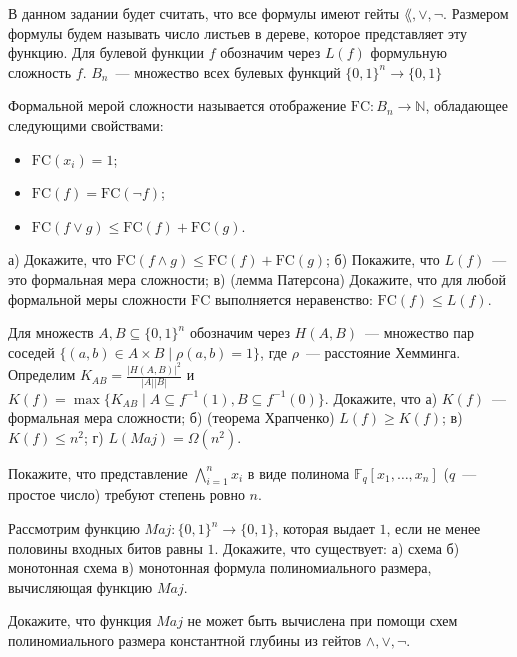 \setcounter{curtask}{6}



В данном задании будет считать, что все формулы имеют гейты $\lang, \lor, \neg$. Размером формулы будем называть число листьев в
дереве, которое представляет эту функцию. Для булевой функции $f$ обозначим через $L(f)$ формульную сложность $f$. $B_n$~---
множество всех булевых функций $\{0, 1\}^n \rightarrow \{0, 1\}$

\begin{task}
    Формальной мерой сложности называется отображение $\mathrm{FC}: B_n \to \mathbb{N}$, обладающее следующими свойствами:
    \begin{itemize}
        \item $\mathrm{FC}(x_i) = 1$;
        \item $\mathrm{FC}(f) = \mathrm{FC}(\neg f)$;
    	\item $\mathrm{FC}(f \lor g) \le \mathrm{FC}(f) + \mathrm{FC}(g)$.
	\end{itemize}

	а) Докажите, что $\mathrm{FC}(f \land g) \le \mathrm{FC}(f) + \mathrm{FC}(g)$; б) Покажите, что $L(f)$~--- это формальная мера
    сложности; в) (лемма Патерсона) Докажите, что для любой формальной меры сложности $\mathrm{FC}$ выполняется неравенство:
    $\mathrm{FC}(f) \le L(f)$.
\end{task}

\begin{task}
    Для множеств $A, B \subseteq \{0, 1\}^n$ обозначим через $H(A, B)$~--- множество пар соседей $\{(a, b) \in A \times B \mid
    \rho(a, b) = 1\}$, где $\rho$~--- расстояние Хемминга. Определим $K_{AB} = \frac{|H(A, B)|^2}{|A| |B|}$ и $K(f) = \max
    \{K_{AB} \mid A \subseteq f^{-1}(1), B \subseteq f^{-1}(0)\}$. Докажите, что а) $K(f)$~--- формальная мера сложности; б)
    (теорема Храпченко) $L(f) \ge K(f)$; в) $K(f) \le n^2$; г) $L(Maj) = \Omega(n^2)$.
\end{task}

\begin{task}
    Покажите, что представление $\bigwedge\limits_{i = 1}^{n} x_i$ в виде полинома $\mathbb{F}_q[x_1, \dots, x_n]$ ($q$~--- простое
    число) требуют степень ровно $n$.
\end{task}


\breakline

\begin{ptask}{1}
    Рассмотрим функцию $Maj: \{0, 1\}^n \rightarrow \{0, 1\}$, которая выдает $1$, если не менее половины входных битов равны
    $1$. Докажите, что существует: а) схема б) монотонная схема в) монотонная формула полиномиального размера, вычисляющая функцию
    $Maj$.
\end{ptask}

\begin{ptask}{5}
    Докажите, что функция $Maj$ не может быть вычислена при помощи схем полиномиального размера константной глубины из гейтов
    $\land, \lor, \neg$.
\end{ptask}